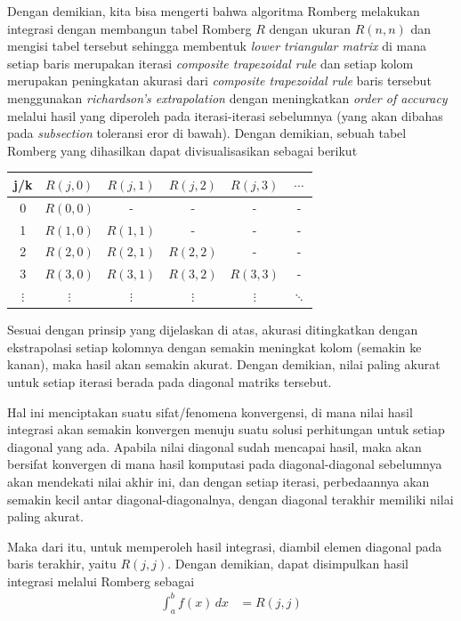 \documentclass[journal,12pt,onecolumn,a4paper]{IEEEtran}
\begin{document}
\begin{enumerate}
	      Dengan demikian, kita bisa mengerti bahwa algoritma Romberg melakukan integrasi dengan membangun tabel Romberg \(R\) dengan ukuran \(R(n,n)\) dan mengisi tabel tersebut sehingga membentuk \emph{lower triangular matrix} di mana setiap baris merupakan iterasi \emph{composite trapezoidal rule} dan setiap kolom merupakan peningkatan akurasi dari \emph{composite trapezoidal rule} baris tersebut menggunakan \emph{richardson's extrapolation} dengan meningkatkan \emph{order of accuracy} melalui hasil yang diperoleh pada iterasi-iterasi sebelumnya (yang akan dibahas pada \emph{subsection} toleransi eror di bawah). Dengan demikian, sebuah tabel Romberg yang dihasilkan dapat divisualisasikan sebagai berikut

	      \begin{center}
		      \begin{tabular}{ c | c c c c c }

			      j/k        & \(R(j,0)\) & \(R(j,1)\) & \(R(j,2)\) & \(R(j,3)\) & \(\cdots\) \\
			      \hline
			      0          & \(R(0,0)\) & -          & -          & -          & -          \\
			      1          & \(R(1,0)\) & \(R(1,1)\) & -          & -          & -          \\
			      2          & \(R(2,0)\) & \(R(2,1)\) & \(R(2,2)\) & -          & -          \\
			      3          & \(R(3,0)\) & \(R(3,1)\) & \(R(3,2)\) & \(R(3,3)\) & -          \\
			      \(\vdots\) & \(\vdots\) & \(\vdots\) & \(\vdots\) & \(\vdots\) & \(\ddots\) \\
		      \end{tabular}
	      \end{center}

	      Sesuai dengan prinsip yang dijelaskan di atas, akurasi ditingkatkan dengan ekstrapolasi setiap kolomnya dengan semakin meningkat kolom (semakin ke kanan), maka hasil akan semakin akurat. Dengan demikian, nilai paling akurat untuk setiap iterasi berada pada diagonal matriks tersebut.

	      Hal ini menciptakan suatu sifat/fenomena konvergensi, di mana nilai hasil integrasi akan semakin konvergen menuju suatu solusi perhitungan untuk setiap diagonal yang ada. Apabila nilai diagonal sudah mencapai hasil, maka akan bersifat konvergen di mana hasil komputasi pada diagonal-diagonal sebelumnya akan mendekati nilai akhir ini, dan dengan setiap iterasi, perbedaannya akan semakin kecil antar diagonal-diagonalnya, dengan diagonal terakhir memiliki nilai paling akurat.

	      Maka dari itu, untuk memperoleh hasil integrasi, diambil elemen diagonal pada baris terakhir, yaitu \(R(j,j)\). Dengan demikian, dapat disimpulkan hasil integrasi melalui Romberg sebagai
	      \begin{equation*}
		      \begin{split}
			      \int_{a}^{b} f(x) \,dx & = R(j,j)
		      \end{split}
	      \end{equation*}
\end{enumerate}
\end{document}
